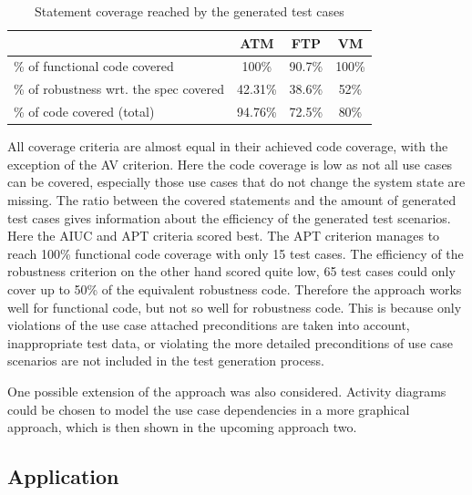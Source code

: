\begin{table}[h]
	\begin{small} 
	\centering
	\caption{Statement coverage reached by the generated test cases}
	\label{codecoverage}
	\setlength{\tabcolsep}{1em}
		\begin{tabular}{l|c|c|c}
			\hline
			& \textbf{ATM} & \textbf{FTP} & \textbf{VM} \\
			\hline	
			\% of functional code covered & 100\% & 90.7\% & 100\% \\
			\hline
			\% of robustness wrt. the spec covered & 42.31\% & 38.6\% & 52\% \\
			\hline
			\% of code covered (total) & 94.76\% & 72.5\% & 80\% \\
			\hline
		\end{tabular}
	\end{small}
\end{table}

All coverage criteria are almost equal in their achieved code coverage, with the exception of the AV criterion. Here the code coverage is low as not all use cases can be covered, especially those use cases that do not change the system state are missing. The ratio between the covered statements and the amount of generated test cases gives information about the efficiency of the generated test scenarios. Here the AIUC and APT criteria scored best. The APT criterion manages to reach 100\% functional code coverage with only 15 test cases. The efficiency of the robustness criterion on the other hand scored quite low, 65 test cases could only cover up to 50\% of the equivalent robustness code. Therefore the approach works well for functional code, but not so well for robustness code. This is because only violations of the use case attached preconditions are taken into account, inappropriate test data, or violating the more detailed preconditions of use case scenarios are not included in the test generation process. 

One possible extension of the approach was also considered. Activity diagrams could be chosen to model the use case dependencies in a more graphical approach, which is then shown in the upcoming approach two. 

\subsection{Application}

